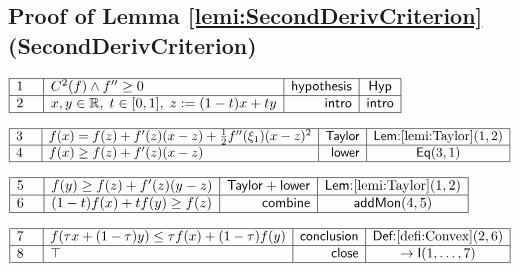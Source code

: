 \documentclass[11pt,reqno]{amsart}
\providecommand{\R}{\mathbb{R}}
\begin{document}
	\subsection*{Proof of Lemma \protect\ref{lemi:SecondDerivCriterion} (\textsf{SecondDerivCriterion})}
	\noindent$\begin{array}{|m{0.5cm}|l|r|c|}
	\hline
	1 & C^{2}(f)\wedge f^{\prime\prime}\ge0 & \mathsf{hypothesis} & \mathsf{Hyp} \\ \hline
	2 & x,y\in\R,\;t\in[0,1],\;z:=(1-t)x+ty & \mathsf{intro} & \mathsf{intro} \\ \hline
	\end{array}$
	\par\nointerlineskip\noindent$\begin{array}{|m{0.5cm}|l|r|c|}
	\hline
	3 & f(x)=f(z)+f^{\prime}(z)(x-z)+\tfrac12 f^{\prime\prime}(\xi_{1})(x-z)^{2} & \mathsf{Taylor} & \textsf{Lem:}\ref{lemi:Taylor}(1,2) \\ \hline
	4 & f(x)\ge f(z)+f^{\prime}(z)(x-z) & \mathsf{lower} & \mathsf{Eq}(3,1) \\ \hline
	\end{array}$
	\par\nointerlineskip\noindent$\begin{array}{|m{0.5cm}|l|r|c|}
	\hline
	5 & f(y)\ge f(z)+f^{\prime}(z)(y-z) & \mathsf{Taylor+lower} & \textsf{Lem:}\ref{lemi:Taylor}(1,2) \\ \hline
	6 & (1-t)f(x)+tf(y)\ge f(z) & \mathsf{combine} & \mathsf{addMon}(4,5) \\ \hline
	\end{array}$
	\par\nointerlineskip\noindent$\begin{array}{|m{0.5cm}|l|r|c|}
	\hline
	7 & f(\tau x+(1-\tau)y)\le\tau f(x)+(1-\tau)f(y) & \mathsf{conclusion} & \textsf{Def:}\ref{defi:Convex}(2,6) \\ \hline
	8 & \top & \mathsf{close} & \to\mathsf{I}(1,\dots,7) \\ \hline
	\end{array}$
	\medskip
	
\end{document}
